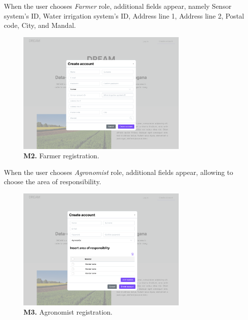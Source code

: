     When the user chooses \textit{Farmer} role, additional fields appear, namely Sensor system's ID, Water irrigation system's ID, Address line 1, Address line 2, Postal code, City, and Mandal.
    \begin{figure}[H]
        \centering
        \includegraphics[width=0.75\textwidth]{mockups/Unreg. user_Create account_Farmer.png}
        \caption{\textbf{M2.} Farmer registration.}
        \label{fig:farmer-create-account}
    \end{figure}
    
    When the user chooses \textit{Agronomist} role, additional fields appear, allowing to choose the area of responsibility.
    \begin{figure}[H]
        \centering
        \includegraphics[width=0.75\textwidth]{mockups/Unreg. user_Create account_Agronomist.png}
        \caption{\textbf{M3.} Agronomist registration.}
        \label{fig:agronomist-create-account}
    \end{figure}
    
